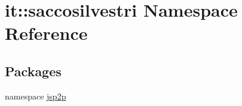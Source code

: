 \hypertarget{namespaceit_1_1saccosilvestri}{
\section{it\-:\-:saccosilvestri \-Namespace \-Reference}
\label{namespaceit_1_1saccosilvestri}
}
\subsection*{\-Packages}
\begin{DoxyCompactItemize}
\item 
namespace \hyperlink{namespaceit_1_1saccosilvestri_1_1jsp2p}{jsp2p}
\end{DoxyCompactItemize}

